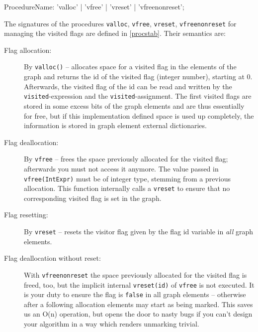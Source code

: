 \pagebreak

\begin{rail}
  ProcedureName: 'valloc' | 'vfree' | 'vreset' | 'vfreenonreset';
\end{rail}

The signatures of the procedures \texttt{valloc}, \texttt{vfree}, \texttt{vreset}, \texttt{vfreenonreset} for managing the visited flags are defined in \ref{procstab}.
Their semantics are:
\begin{description}
\item[Flag allocation:] By \texttt{valloc()}\label{allocvisitflag} -- allocates space for a visited flag in the elements of the graph and returns the id of the visited flag (integer number), starting at 0.
Afterwards, the visited flag of the id can be read and written by the \texttt{visited}-expression and the \texttt{visited}-assignment.
The first visited flags are stored in some excess bits of the graph elements and are thus essentially for free,
but if this implementation defined space is used up completely, the information is stored in graph element external dictionaries.
\item[Flag deallocation:] By \texttt{vfree} -- frees the space previously allocated for the visited flag; afterwards you must not access it anymore.
The value passed in \texttt{vfree(IntExpr)} must be of integer type, stemming from a previous allocation.
This function internally calls a \texttt{vreset} to ensure that no corresponding visited flag is set in the graph.
\item[Flag resetting:] By \texttt{vreset} -- resets the visitor flag given by the flag id variable in \emph{all} graph elements.
\item[Flag deallocation without reset:] With \texttt{vfreenonreset} the space previously allocated for the visited flag is freed, too, but the implicit internal \texttt{vreset(id)} of \texttt{vfree} is not executed. It is your duty to ensure the flag is \texttt{false} in all graph elements -- otherwise after a following allocation elements may start as being marked. This saves us an O(n) operation, but opens the door to nasty bugs if you can't design your algorithm in a way which renders unmarking trivial.
\end{description}


